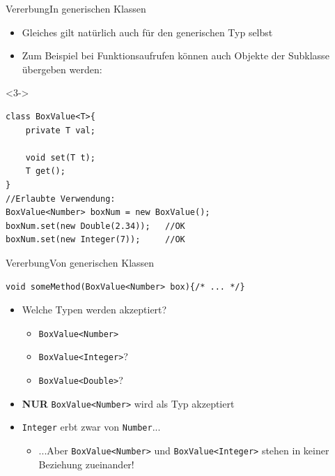 \begin{frame}[fragile]{Vererbung}{In generischen Klassen}
    \begin{itemize}
        \item Gleiches gilt natürlich auch für den generischen Typ selbst
        \item<2-> Zum Beispiel bei Funktionsaufrufen können auch Objekte der Subklasse übergeben werden:
    \end{itemize}
    \lstset{style=javacode}
    \begin{onlyenv}<3->
    \begin{lstlisting}
class BoxValue<T>{
    private T val;
    
    void set(T t);
    T get();
}
//Erlaubte Verwendung:
BoxValue<Number> boxNum = new BoxValue();
boxNum.set(new Double(2.34));   //OK
boxNum.set(new Integer(7));     //OK
    \end{lstlisting}
    \end{onlyenv}
\end{frame}

\begin{frame}[fragile]{Vererbung}{Von generischen Klassen}
\lstset{style=javacode}
\begin{lstlisting}
void someMethod(BoxValue<Number> box){/* ... */}
\end{lstlisting}
\begin{itemize}
    \item<2-> Welche Typen werden akzeptiert?
    \begin{itemize}
        \item<3-> \texttt{BoxValue<Number>}
        \item<4-> \texttt{BoxValue<Integer>}?
        \item<5-> \texttt{BoxValue<Double>}?
    \end{itemize}
    \item<6-> \textbf{NUR} \texttt{BoxValue<Number>} wird als Typ akzeptiert
    \item<7-> \texttt{Integer} erbt zwar von \texttt{Number}...
    \begin{itemize}
        \item<8-> ...Aber \texttt{BoxValue<Number>} und \texttt{BoxValue<Integer>} stehen in keiner Beziehung zueinander!
    \end{itemize}
\end{itemize}
\end{frame}

